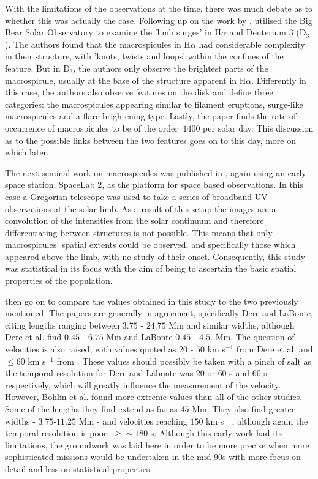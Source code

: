 With the limitations of the observations at the time, there was much debate as to whether this was actually the case. 
Following up on the work by \cite{Bohlin1975}, \cite{LaBonte79} utilised the Big Bear Solar Observatory to examine the 'limb surges' in H$\alpha$ and Deuterium 3 (D$_3$).
The authors found that the macrospicules in H$\alpha$ had considerable complexity in their structure, with 'knots, twists and loops' within the confines of the feature.
But in D$_3$, the authors only observe the brightest parts of the macrospicule, usually at the base of the structure apparent in H$\alpha$.
Differently in this case, the authors also observe features on the disk and define three categories: the macrospicules appearing similar to filament eruptions, surge-like macrospicules and a flare brightening type.
Lastly, the paper finds the rate of occurrence of macrospicules to be of the order $~1400$ per solar day. 
This discussion as to the possible links between the two features goes on to this day, more on which later.

The next seminal work on macrospicules was published in \cite{Dere89}, again using an early space station, SpaceLab 2, as the platform for space based observations.
In this case a Gregorian telescope was used to take a series of broadband UV observations at the solar limb.
As a result of this setup the images are a convolution of the intensities from the solar continuum and therefore differentiating between structures is not possible.
This means that only macrospicules' spatial extents could be observed, and specifically those which appeared above the limb, with no study of their onset.
Consequently, this study was statistical in its focus with the aim of being to ascertain the basic spatial properties of the population.

\cite{Dere89} then go on to compare the values obtained in this study to the two previously mentioned.
The papers are generally in agreement, specifically Dere and LaBonte, citing lengths ranging between $3.75$ - $24.75$ Mm and similar widths, although Dere et al. find $0.45$ - $6.75$ Mm and LaBonte $0.45$ - $4.5$. Mm.
The question of velocities is also raised, with values quoted as $20$ - $50$ km s${^{-1}}$ from Dere et al. and $\leq60$ km s${^{-1}}$ from \cite{LaBonte1979}.
These values should possibly be taken with a pinch of salt as the temporal resolution for Dere and Labonte was $20$ or $60$ s and $60$ s respectively, which will greatly influence the measurement of the velocity.
However, Bohlin et al. found more extreme values than all of the other studies.
Some of the lengths they find extend as far as $45$ Mm.
They also find greater widths - $3.75$-$11.25$ Mm - and velocities reaching $150$ km s${^{-1}}$, although again the temporal resolution is poor, $\geq \sim 180$ s.
Although this early work had its limitations, the groundwork was laid here in order to be more precise when more sophisticated missions would be undertaken in the mid $90$s with more focus on detail and less on statistical properties.

